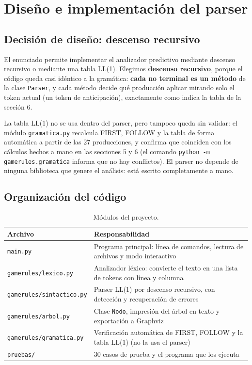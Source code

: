 \section{Diseño e implementación del parser}

\subsection{Decisión de diseño: descenso recursivo}

El enunciado permite implementar el analizador predictivo mediante descenso recursivo o mediante una tabla LL(1). Elegimos \textbf{descenso recursivo}, porque el código queda casi idéntico a la gramática: \textbf{cada no terminal es un método} de la clase \texttt{Parser}, y cada método decide qué producción aplicar mirando solo el token actual (un token de anticipación), exactamente como indica la tabla de la sección 6.

La tabla LL(1) no se usa dentro del parser, pero tampoco queda sin validar: el módulo \texttt{gramatica.py} recalcula FIRST, FOLLOW y la tabla de forma automática a partir de las 27 producciones, y confirma que coinciden con los cálculos hechos a mano en las secciones 5 y 6 (el comando \texttt{python -m gamerules.gramatica} informa que no hay conflictos). El parser no depende de ninguna biblioteca que genere el análisis: está escrito completamente a mano.

\subsection{Organización del código}

\begin{table}[H]
\centering
\caption{Módulos del proyecto.}
\small
\renewcommand{\arraystretch}{1.3}
\begin{tabularx}{\textwidth}{|l|X|}
\hline
\textbf{Archivo} & \textbf{Responsabilidad} \\ \hline
\texttt{main.py} & Programa principal: línea de comandos, lectura de archivos y modo interactivo \\ \hline
\texttt{gamerules/lexico.py} & Analizador léxico: convierte el texto en una lista de tokens con línea y columna \\ \hline
\texttt{gamerules/sintactico.py} & Parser LL(1) por descenso recursivo, con detección y recuperación de errores \\ \hline
\texttt{gamerules/arbol.py} & Clase \texttt{Nodo}, impresión del árbol en texto y exportación a Graphviz \\ \hline
\texttt{gamerules/gramatica.py} & Verificación automática de FIRST, FOLLOW y la tabla LL(1) (no la usa el parser) \\ \hline
\texttt{pruebas/} & 30 casos de prueba y el programa que los ejecuta \\ \hline
\end{tabularx}
\end{table}

